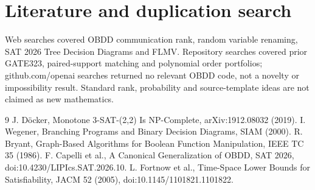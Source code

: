 \documentclass[11pt]{article}
\begin{document}
\section{Literature and duplication search}
Web searches covered OBDD communication rank, random variable renaming, SAT 2026 Tree Decision Diagrams and FLMV. Repository searches covered prior GATE323, paired-support matching and polynomial order portfolios; github.com/openai searches returned no relevant OBDD code, not a novelty or impossibility result. Standard rank, probability and source-template ideas are not claimed as new mathematics.
\begin{thebibliography}{9}
 J. D\"ocker, Monotone 3-SAT-(2,2) Is NP-Complete, arXiv:1912.08032 (2019).
 I. Wegener, Branching Programs and Binary Decision Diagrams, SIAM (2000).
 R. Bryant, Graph-Based Algorithms for Boolean Function Manipulation, IEEE TC 35 (1986).
 F. Capelli et al., A Canonical Generalization of OBDD, SAT 2026, doi:10.4230/LIPIcs.SAT.2026.10.
 L. Fortnow et al., Time-Space Lower Bounds for Satisfiability, JACM 52 (2005), doi:10.1145/1101821.1101822.
\end{thebibliography}
\end{document}
